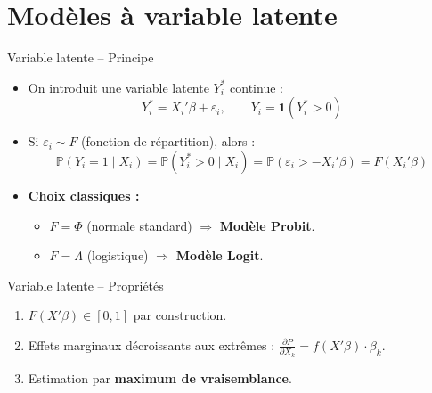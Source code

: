 \documentclass[11pt,aspectratio=169]{beamer}
\newcommand{\Prob}{\mathbb{P}}
\begin{document}
\section{Modèles à variable latente}

\begin{frame}{Variable latente -- Principe}

\begin{itemize}

\item On introduit une variable latente $Y_i^*$ continue :
  \[
  Y_i^* = X_i'\beta + \varepsilon_i, \qquad Y_i = \mathbf{1}(Y_i^* > 0)
  \]\newline

\item Si $\varepsilon_i \sim F$ (fonction de répartition), alors :
  \[
  \Prob(Y_i = 1 \mid X_i) = \Prob(Y_i^* > 0 \mid X_i) = \Prob(\varepsilon_i > -X_i'\beta) = F(X_i'\beta)
  \]\newline

\item \textbf{Choix classiques :}
  \begin{itemize}
  \item $F = \Phi$ (normale standard) $\Rightarrow$ \textbf{Modèle Probit}.
  \item $F = \Lambda$ (logistique) $\Rightarrow$ \textbf{Modèle Logit}.
  \end{itemize}

\end{itemize}

\end{frame}

\begin{frame}{Variable latente -- Propriétés}

\begin{enumerate}

\item $F(X'\beta) \in [0,1]$ par construction.\newline

\item Effets marginaux décroissants aux extrêmes : $\frac{\partial P}{\partial X_k} = f(X'\beta) \cdot \beta_k$.\newline

\item Estimation par \textbf{maximum de vraisemblance}.

\end{enumerate}

\end{frame}
\end{document}
